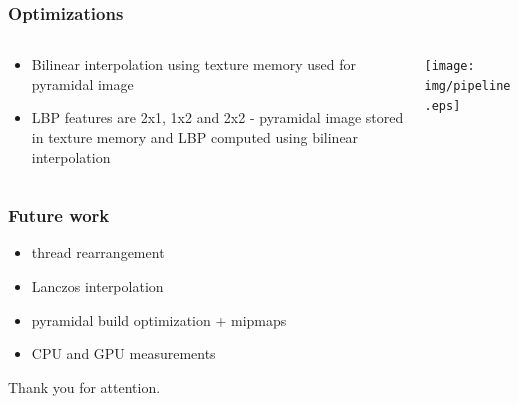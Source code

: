 \documentclass{beamer}
\begin{document}
	\begin{frame}[t,fragile]
	\frametitle{Optimizations}					
	\begin{columns}[onlytextwidth]				
		\begin{column}{0.60\textwidth}
		    \begin{itemize}
				\item Bilinear interpolation using texture memory used for pyramidal image
				\item LBP features are 2x1, 1x2 and 2x2 - pyramidal image stored in texture memory and LBP computed using bilinear interpolation
			\end{itemize}
		\end{column}
		
		\begin{column}{0.35\textwidth}
			\texttt{[image: img/pipeline.eps]}
		\end{column}	

	\end{columns}		
	\end{frame}
	
	
	\begin{frame}[t,fragile]
	\frametitle{Future work}	
				
	\begin{itemize}
		\item thread rearrangement
		\item Lanczos interpolation
		\item pyramidal build optimization + mipmaps
		\item CPU and GPU measurements
	\end{itemize}				
						
	\end{frame}		
	
	
	
	\begin{frame}[t,fragile]
	\vspace{33mm}	
	\begin{Large}
	\begin{center}
		 Thank you for attention.
	\end{center}
	\end{Large}				
						
	\end{frame}
\end{document}
